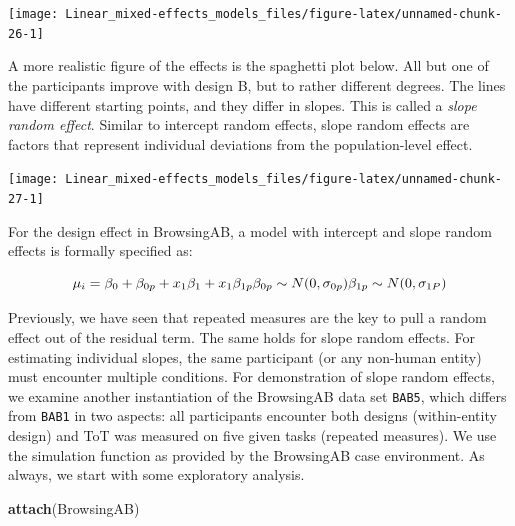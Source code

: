 \documentclass[]{svmono}
\newenvironment{Shaded}{\begin{snugshade}}{\end{snugshade}}
\newcommand{\KeywordTok}[1]{\textcolor[rgb]{0.13,0.29,0.53}{\textbf{#1}}}
\newcommand{\DataTypeTok}[1]{\textcolor[rgb]{0.13,0.29,0.53}{#1}}
\newcommand{\DecValTok}[1]{\textcolor[rgb]{0.00,0.00,0.81}{#1}}
\newcommand{\StringTok}[1]{\textcolor[rgb]{0.31,0.60,0.02}{#1}}
\newcommand{\OperatorTok}[1]{\textcolor[rgb]{0.81,0.36,0.00}{\textbf{#1}}}
\newcommand{\NormalTok}[1]{#1}
\begin{document}
\texttt{[image: Linear\_mixed-effects\_models\_files/figure-latex/unnamed-chunk-26-1]}

A more realistic figure of the effects is the spaghetti plot below. All
but one of the participants improve with design B, but to rather
different degrees. The lines have different starting points, and they
differ in slopes. This is called a \emph{slope random effect}. Similar
to intercept random effects, slope random effects are factors that
represent individual deviations from the population-level effect.

\begin{Shaded}
\end{Shaded}

\texttt{[image: Linear\_mixed-effects\_models\_files/figure-latex/unnamed-chunk-27-1]}

For the design effect in BrowsingAB, a model with intercept and slope
random effects is formally specified as:

\[
\mu_i = \beta_0 + \beta_{0p} + x_1\beta_1 + x_{1}\beta_{1p}\\
\beta_{0p} \sim N(0,\sigma_{0p})\\
\beta_{1p} \sim N(0,\sigma_{1P})
\]

Previously, we have seen that repeated measures are the key to pull a
random effect out of the residual term. The same holds for slope random
effects. For estimating individual slopes, the same participant (or any
non-human entity) must encounter multiple conditions. For demonstration
of slope random effects, we examine another instantiation of the
BrowsingAB data set \texttt{BAB5}, which differs from \texttt{BAB1} in
two aspects: all participants encounter both designs (within-entity
design) and ToT was measured on five given tasks (repeated measures). We
use the simulation function as provided by the BrowsingAB case
environment. As always, we start with some exploratory analysis.

\begin{Shaded}
\begin{Highlighting}[]
\KeywordTok{attach}\NormalTok{(BrowsingAB)}
\end{Highlighting}
\end{Shaded}
\end{document}

